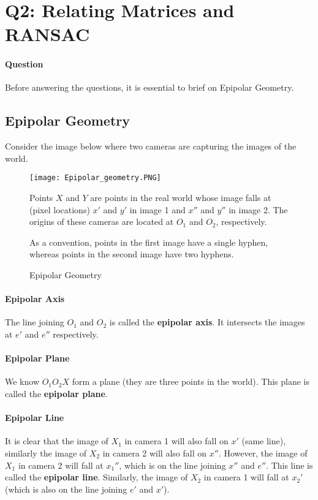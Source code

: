 
\section{Q2: Relating Matrices and RANSAC}

\paragraph*{Question}
\begin{displayquote}
    
\end{displayquote}

Before answering the questions, it is essential to brief on Epipolar Geometry.

\subsection{Epipolar Geometry}

Consider the image below where two cameras are capturing the images of the world.

\begin{figure}[h]
    \centering
    \texttt{[image: Epipolar\_geometry.PNG]}
    \caption{Epipolar Geometry}
    \label{fig:q2-epipolar-geometry}
    \small
        Points $X$ and $Y$ are points in the real world whose image falls at (pixel locations) $x'$ and $y'$ in image 1 and $x''$ and $y''$ in image 2. 
        The origins of these cameras are located at $O_1$ and $O_2$, respectively.

        As a convention, points in the first image have a single hyphen, whereas points in the second image have two hyphens.
\end{figure}

\paragraph*{Epipolar Axis}
The line joining $O_1$ and $O_2$ is called the \textbf{epipolar axis}. It intersects the images at $e'$ and $e''$ respectively.

\paragraph*{Epipolar Plane}
We know $O_1 O_2 X$ form a plane (they are three points in the world). This plane is called the \textbf{epipolar plane}.

\paragraph*{Epipolar Line}
It is clear that the image of $X_1$ in camera 1 will also fall on $x'$ (same line), similarly the image of $X_2$ in camera 2 will also fall on $x''$. However, the image of $X_1$ in camera 2 will fall at $x_1''$, which is on the line joining $x''$ and $e''$. This line is called the \textbf{epipolar line}. Similarly, the image of $X_2$ in camera 1 will fall at $x_2'$ (which is also on the line joining $e'$ and $x'$).

